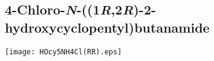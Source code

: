 %
%

\subsection{4\hyp{}Chloro\hyp{}\textit{N}\hyp{}((1\textit{R},2\textit{R})\hyp{}2\hyp{}hydroxycyclopentyl)butanamide }


\begin{scheme}[H]
	\begin{center}
		\texttt{[image: HOcy5NH4Cl(RR).eps]}
	\end{center}
\end{scheme}

